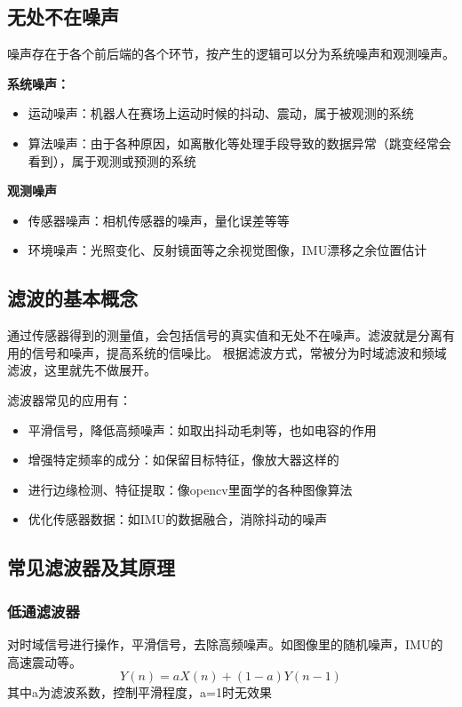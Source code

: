 \subsection{无处不在噪声}
噪声存在于各个前后端的各个环节，按产生的逻辑可以分为系统噪声和观测噪声。

\noindent\textbf{系统噪声：}
\begin{itemize}
    \item 运动噪声：机器人在赛场上运动时候的抖动、震动，属于被观测的系统
    \item 算法噪声：由于各种原因，如离散化等处理手段导致的数据异常（跳变经常会看到），属于观测或预测的系统
\end{itemize}
\textbf{观测噪声}
\begin{itemize}
    \item 传感器噪声：相机传感器的噪声，量化误差等等
    \item 环境噪声：光照变化、反射镜面等之余视觉图像，IMU漂移之余位置估计
\end{itemize}

\subsection{滤波的基本概念}
通过传感器得到的测量值，会包括信号的真实值和无处不在噪声。滤波就是分离有用的信号和噪声，提高系统的信噪比。
根据滤波方式，常被分为时域滤波和频域滤波，这里就先不做展开。

滤波器常见的应用有：
\begin{itemize}
    \item 平滑信号，降低高频噪声：如取出抖动毛刺等，也如电容的作用
    \item 增强特定频率的成分：如保留目标特征，像放大器这样的
    \item 进行边缘检测、特征提取：像opencv里面学的各种图像算法
    \item 优化传感器数据：如IMU的数据融合，消除抖动的噪声
\end{itemize}

\subsection{常见滤波器及其原理}
\subsubsection{低通滤波器}
对时域信号进行操作，平滑信号，去除高频噪声。如图像里的随机噪声，IMU的高速震动等。
$$Y(n)=aX(n)+(1-a)Y(n-1)$$
其中a为滤波系数，控制平滑程度，a=1时无效果


